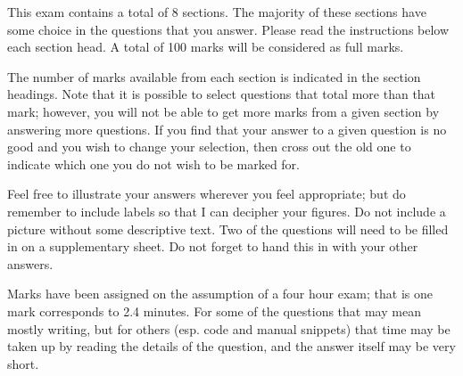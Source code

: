 \documentclass[11pt]{article}
\begin{document}
This exam contains a total of 8 sections. The majority of these sections have
some choice in the questions that you answer. Please read the instructions
below each section head. A total of 100 marks will be considered as full marks.

The number of marks available from each section is indicated in the section
headings. Note that it is possible to select questions that total more than
that mark; however, you will not be able to get more marks from a given
section by answering more questions. If you find that your answer to a given
question is no good and you wish to change your selection, then cross out the
old one to indicate which one you do not wish to be marked for.

Feel free to illustrate your answers wherever you feel appropriate; but do
remember to include labels so that I can decipher your figures. Do not include
a picture without some descriptive text. Two of the questions will need to be
filled in on a supplementary sheet. Do not forget to hand this in with your
other answers.

Marks have been assigned on the assumption of a four hour exam; that is one mark
corresponds to 2.4 minutes. For some of the questions that may mean mostly
writing, but for others (esp. code and manual snippets) that time may be taken up by
reading the details of the question, and the answer itself may be very
short.
\end{document}
